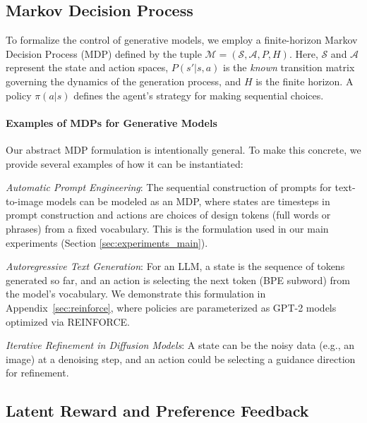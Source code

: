 \documentclass{article}
\newcommand{\mS}{\mathcal{S}}
\newcommand{\mA}{\mathcal{A}}
\begin{document}
\vspace{-0.2cm} \subsection{Markov Decision Process}
To formalize the control of generative models, we employ a finite-horizon Markov Decision Process (MDP) defined by the tuple $\mathcal{M} = (\mS, \mA, P, H)$. Here, $\mS$ and $\mA$ represent the state and action spaces, $P(s'|s,a)$ is the \emph{known} transition matrix governing the dynamics of the generation process, and $H$ is the finite horizon. A policy $\pi(a|s)$ defines the agent's strategy for making sequential choices.

\vspace{-0.2cm}\paragraph{Examples of MDPs for Generative Models} 
Our abstract MDP formulation is intentionally general. To make this concrete, we provide several examples of how it can be instantiated:
\vspace{-0.2cm}
\begin{description}
    \item \emph{Automatic Prompt Engineering}: The sequential construction of prompts for text-to-image models can be modeled as an MDP, where states are timesteps in prompt construction and actions are choices of design tokens (full words or phrases) from a fixed vocabulary. This is the formulation used in our main experiments (Section \ref{sec:experiments_main}).
    \item \emph{Autoregressive Text Generation}: For an LLM, a state is the sequence of tokens generated so far, and an action is selecting the next token (BPE subword) from the model's vocabulary. We demonstrate this formulation in Appendix~\ref{sec:reinforce}, where policies are parameterized as GPT-2 models optimized via REINFORCE.
    \item \emph{Iterative Refinement in Diffusion Models}: A state can be the noisy data (e.g., an image) at a denoising step, and an action could be selecting a guidance direction for refinement.
\end{description}
\vspace{-0.2cm}\subsection{Latent Reward and Preference Feedback}
\end{document}
